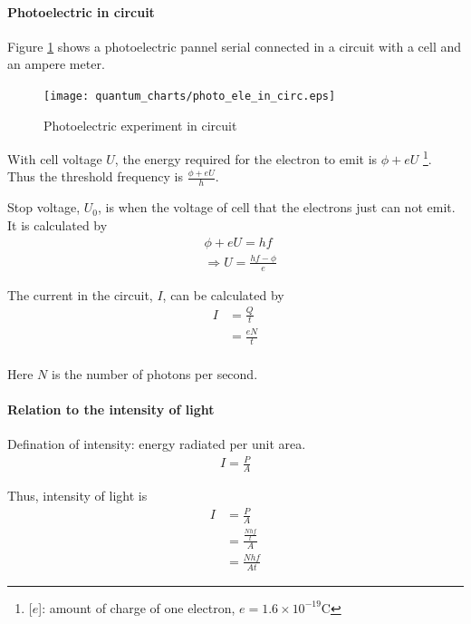         \paragraph{Photoelectric in circuit}
            Figure \ref{ph_ele_in_circ} shows a photoelectric pannel serial connected in a circuit with a cell and an ampere meter. 

            \begin{figure}[H]
                \begin{center}
                    \texttt{[image: quantum\_charts/photo\_ele\_in\_circ.eps]}
                \end{center}
                \caption{Photoelectric experiment in circuit}
                \label{ph_ele_in_circ}
            \end{figure}

            With cell voltage $U$, the energy required for the electron to emit is $\phi + eU$ \footnote{[$e$]: amount of charge of one electron, $e = 1.6 \times 10^{-19} \mathrm{C}$}. Thus the threshold frequency is $\frac{\phi + eU}{h}$.

            Stop voltage, $U_0$, is when the voltage of cell that the electrons just can not emit. It is calculated by
            \begin{align}
                &\phi + eU = hf \\
                &\Rightarrow U = \frac{hf - \phi}{e}
            \end{align}

            The current in the circuit, $I$, can be calculated by
            \begin{align}
                I &= \frac{Q}{t} \\
                    &= \frac{eN}{t} \\
            \end{align}

            Here $N$ is the number of photons per second.
        
        \paragraph{Relation to the intensity of light}
            Defination of intensity: energy radiated per unit area.
            \begin{align}
                I = \frac{P}{A}
            \end{align}

            Thus, intensity of light is
            \begin{align}
                I &= \frac{P}{A} \\
                    &= \frac{\frac{N h f}{t}}{A} \\
                    &= \frac{N h f}{A t}
            \end{align}


